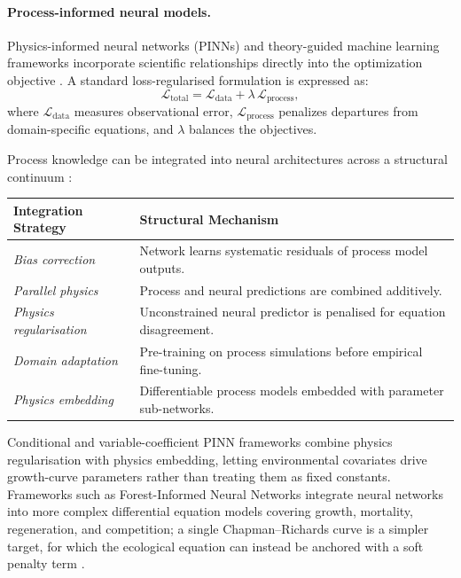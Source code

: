 \paragraph*{Process-informed neural models.}
Physics-informed neural networks (PINNs) and theory-guided machine learning frameworks incorporate scientific relationships directly into the optimization objective \citep{karpatne2017Theory_C4_NN,raissi2019Physics_C4_NN,karniadakis2021Physics_C4_NN,willard2022Integrating_C4_NN}. A standard loss-regularised formulation is expressed as:
\begin{equation}
\mathcal{L}_{\text{total}} = \mathcal{L}_{\text{data}} + \lambda\,\mathcal{L}_{\text{process}},
\label{eq:pinn-loss-general}
\end{equation}
where $\mathcal{L}_{\text{data}}$ measures observational error, $\mathcal{L}_{\text{process}}$ penalizes departures from domain-specific equations, and $\lambda$ balances the objectives.

Process knowledge can be integrated into neural architectures across a structural continuum \citep{wesselkamp2024Process_C4_NN}:
\begin{table}[ht]
\centering
\scriptsize
\begin{tabular}{ll}
\hline
\textbf{Integration Strategy} & \textbf{Structural Mechanism} \\
\hline
\emph{Bias correction} & Network learns systematic residuals of process model outputs. \\
\emph{Parallel physics} & Process and neural predictions are combined additively. \\
\emph{Physics regularisation} & Unconstrained neural predictor is penalised for equation disagreement. \\
\emph{Domain adaptation} & Pre-training on process simulations before empirical fine-tuning. \\
\emph{Physics embedding} & Differentiable process models embedded with parameter sub-networks. \\
\hline
\end{tabular}
\label{tab:pinn-strategies}
\end{table}
Conditional and variable-coefficient PINN frameworks combine physics regularisation with physics embedding, letting environmental covariates drive growth-curve parameters rather than treating them as fixed constants. Frameworks such as Forest-Informed Neural Networks integrate neural networks into more complex differential equation models covering growth, mortality, regeneration, and competition; a single Chapman--Richards curve is a simpler target, for which the ecological equation can instead be anchored with a soft penalty term \citep{pichler2025Inferring_C4_NN}.


